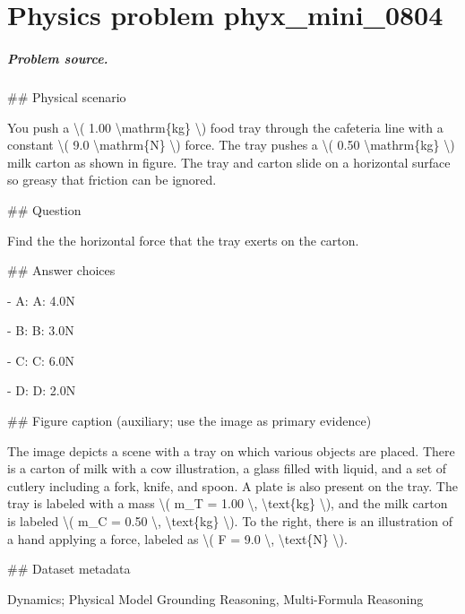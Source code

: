 
\chapter{Physics problem phyx\_mini\_0804}
\label{ch:PhyXMiniProblems_problem_phyx_mini_0804}

\paragraph{Problem source.}
\#\# Physical scenario

You push a \textbackslash{}( 1.00 \textbackslash{}mathrm\{kg\} \textbackslash{}) food tray through the cafeteria line with a constant \textbackslash{}( 9.0 \textbackslash{}mathrm\{N\} \textbackslash{}) force. The tray pushes a \textbackslash{}( 0.50 \textbackslash{}mathrm\{kg\} \textbackslash{}) milk carton as shown in figure. The tray and carton slide on a horizontal surface so greasy that friction can be ignored.

\#\# Question

Find the the horizontal force that the tray exerts on the carton.

\#\# Answer choices

- A: A: 4.0N

- B: B: 3.0N

- C: C: 6.0N

- D: D: 2.0N

\#\# Figure caption (auxiliary; use the image as primary evidence)

The image depicts a scene with a tray on which various objects are placed. There is a carton of milk with a cow illustration, a glass filled with liquid, and a set of cutlery including a fork, knife, and spoon. A plate is also present on the tray. The tray is labeled with a mass \textbackslash{}( m\_T = 1.00 \textbackslash{}, \textbackslash{}text\{kg\} \textbackslash{}), and the milk carton is labeled \textbackslash{}( m\_C = 0.50 \textbackslash{}, \textbackslash{}text\{kg\} \textbackslash{}). To the right, there is an illustration of a hand applying a force, labeled as \textbackslash{}( F = 9.0 \textbackslash{}, \textbackslash{}text\{N\} \textbackslash{}).

\#\# Dataset metadata

Dynamics; Physical Model Grounding Reasoning, Multi-Formula Reasoning

